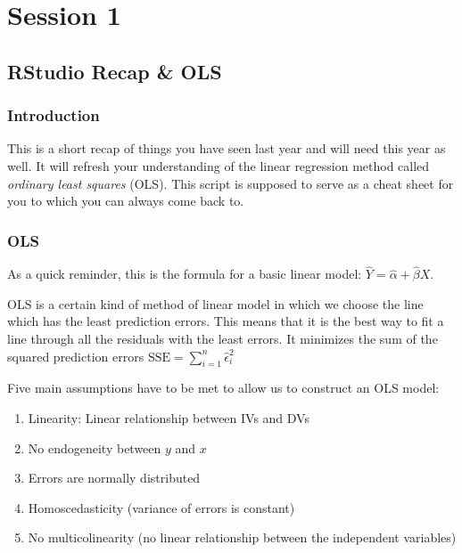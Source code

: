 \documentclass[
  letterpaper,
  DIV=11,
  numbers=noendperiod]{scrreprt}
\providecommand{\tightlist}{%
  \setlength{\itemsep}{0pt}\setlength{\parskip}{0pt}}\usepackage{longtable,booktabs,array}
\begin{document}
\part{Session 1}

\hypertarget{rstudio-recap-ols}{%
\chapter{RStudio Recap \& OLS}\label{rstudio-recap-ols}}

\hypertarget{introduction}{%
\section{Introduction}\label{introduction}}

This is a short recap of things you have seen last year and will need
this year as well. It will refresh your understanding of the linear
regression method called \emph{ordinary least squares} (OLS). This
script is supposed to serve as a cheat sheet for you to which you can
always come back to.

\hypertarget{ols}{%
\section{OLS}\label{ols}}

As a quick reminder, this is the formula for a basic linear model:
\(\widehat{Y} = \widehat{\alpha} + \widehat{\beta} X\).

OLS is a certain kind of method of linear model in which we choose the
line which has the least prediction errors. This means that it is the
best way to fit a line through all the residuals with the least errors.
It minimizes the sum of the squared prediction errors
\(\text{SSE} = \sum_{i=1}^{n} \widehat{\epsilon}_i^2\)

Five main assumptions have to be met to allow us to construct an OLS
model:

\begin{enumerate}
\def\labelenumi{\arabic{enumi}.}
\tightlist
\item
  Linearity: Linear relationship between IVs and DVs
\item
  No endogeneity between \(y\) and \(x\)
\item
  Errors are normally distributed
\item
  Homoscedasticity (variance of errors is constant)
\item
  No multicolinearity (no linear relationship between the independent
  variables)
\end{enumerate}
\end{document}
